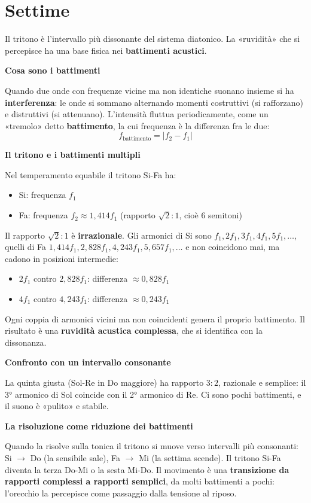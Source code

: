 \section*{Settime}

\begin{fisica}
	\label{phys:battimenti_tritono}

	Il tritono è l'intervallo più dissonante del sistema diatonico. La «ruvidità» che si percepisce ha una base fisica nei \textbf{battimenti acustici}.

	\textbf{Cosa sono i battimenti}

	Quando due onde con frequenze vicine ma non identiche suonano insieme si ha \textbf{interferenza}: le onde si sommano alternando momenti costruttivi (si rafforzano) e distruttivi (si attenuano). L'intensità fluttua periodicamente, come un «tremolo» detto \textbf{battimento}, la cui frequenza è la differenza fra le due:
	\[
	f_{\text{battimento}} = |f_2 - f_1|
	\]

	\textbf{Il tritono e i battimenti multipli}

	Nel temperamento equabile il tritono Si-Fa ha:
	\begin{itemize}
		\item Si: frequenza $f_1$
		\item Fa: frequenza $f_2 \approx 1{,}414 f_1$ (rapporto $\sqrt{2}:1$, cioè 6 semitoni)
	\end{itemize}

	Il rapporto $\sqrt{2}:1$ è \textbf{irrazionale}. Gli armonici di Si sono $f_1, 2f_1, 3f_1, 4f_1, 5f_1, \ldots$, quelli di Fa $1{,}414f_1, 2{,}828f_1, 4{,}243f_1, 5{,}657f_1, \ldots$ e non coincidono mai, ma cadono in posizioni intermedie:
	\begin{itemize}
		\item $2f_1$ contro $2{,}828f_1$: differenza $\approx 0{,}828f_1$
		\item $4f_1$ contro $4{,}243f_1$: differenza $\approx 0{,}243f_1$
	\end{itemize}

	Ogni coppia di armonici vicini ma non coincidenti genera il proprio battimento. Il risultato è una \textbf{ruvidità acustica complessa}, che si identifica con la dissonanza.

	\textbf{Confronto con un intervallo consonante}

	La quinta giusta (Sol-Re in Do maggiore) ha rapporto $3:2$, razionale e semplice: il 3° armonico di Sol coincide con il 2° armonico di Re. Ci sono pochi battimenti, e il suono è «pulito» e stabile.

	\textbf{La risoluzione come riduzione dei battimenti}

	Quando la  risolve sulla tonica il tritono si muove verso intervalli più consonanti: Si $\rightarrow$ Do (la sensibile sale), Fa $\rightarrow$ Mi (la settima scende). Il tritono Si-Fa diventa la terza Do-Mi o la sesta Mi-Do. Il movimento è una \textbf{transizione da rapporti complessi a rapporti semplici}, da molti battimenti a pochi: l'orecchio la percepisce come passaggio dalla tensione al riposo.
\end{fisica}

